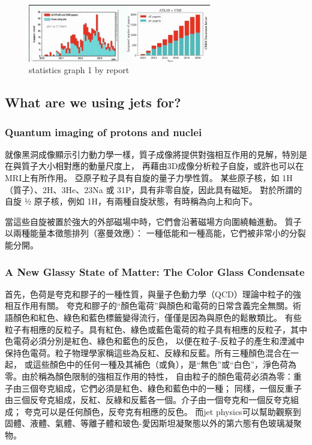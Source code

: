 \documentclass[12pt, a4paper, oneside]{ctexart}
\begin{document}
\begin{spacing}{2.0}
\begin{figure}[htbp]
	\centering
	\includegraphics[width=8cm]{sigma.jpg}
	\caption{statistics graph 1 by report}
\end{figure}
\subsection{What are we using jets for?}
\subsubsection{Quantum imaging of protons and nuclei}
就像黑洞成像顯示引力動力學一樣，質子成像將提供對強相互作用的見解，特別是在與質子大小相對應的動量尺度上，
再藉由3D成像分析粒子自旋，或許也可以在MRI上有所作用。
亞原子粒子具有自旋的量子力學性質。 某些原子核，如 1H（質子）、2H、3He、23Na 或 31P，具有非零自旋，因此具有磁矩。
對於所謂的自旋 1⁄2 原子核，例如 1H，有兩種自旋狀態，有時稱為向上和向下。 

當這些自旋被置於強大的外部磁場中時，它們會沿著磁場方向圍繞軸進動。 質子以兩種能量本徵態排列（塞曼效應）：
一種低能和一種高能，它們被非常小的分裂能分開。
\subsubsection{A New Glassy State of Matter: The Color Glass Condensate}
首先，色荷是夸克和膠子的一種性質，與量子色動力學（QCD）理論中粒子的強相互作用有關。
夸克和膠子的“顏色電荷”與顏色和電荷的日常含義完全無關。術語顏色和紅色、綠色和藍色標籤變得流行，僅僅是因為與原色的鬆散類比。
有些粒子有相應的反粒子。具有紅色、綠色或藍色電荷的粒子具有相應的反粒子，其中色電荷必須分別是紅色、綠色和藍色的反色，
以便在粒子-反粒子的產生和湮滅中保持色電荷。粒子物理學家稱這些為反紅、反綠和反藍。所有三種顏色混合在一起，
或這些顏色中的任何一種及其補色（或負），是“無色”或“白色”，淨色荷為零。由於稱為顏色限制的強相互作用的特性，
自由粒子的顏色電荷必須為零：重子由三個夸克組成，它們必須是紅色、綠色和藍色中的一種；
同樣，一個反重子由三個反夸克組成，反紅、反綠和反藍各一個。介子由一個夸克和一個反夸克組成；
夸克可以是任何顏色，反夸克有相應的反色。
而jet physics可以幫助觀察到固體、液體、氣體、等離子體和玻色-愛因斯坦凝聚態以外的第六態有色玻璃凝聚物。\cite{https://doi.org/10.1111/ijag.12013}

\end{spacing}
\end{document}
